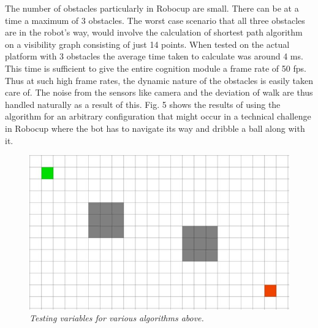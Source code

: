 \documentclass[letterpaper, 10 pt, conference]{ieeeconf}  %
\begin{document}
The number of obstacles particularly in Robocup are small. There can be at a time a maximum of 3 obstacles. The worst case scenario that all three obstacles are in the robot's way, would involve the calculation of shortest path algorithm on a visibility graph consisting of just 14 points. When tested on the actual platform with 3 obstacles the average time taken to calculate was around 4 ms. This time is sufficient to give the entire cognition module a frame rate of 50 fps. Thus at such high frame rates, the dynamic nature of the obstacles is easily taken care of. The noise from the sensors like camera and the deviation of walk are thus handled naturally as a result of this. Fig. 5 shows the results of using the algorithm for an arbitrary configuration that might occur in a technical challenge in Robocup where the bot has to navigate its way and dribble a ball along with it. 

\begin{figure}[t]  
\begin{center}  
\includegraphics[scale=0.4]{testbed.jpg}  
\caption{\small \sl Testing variables for various algorithms above.\label{fig:test3}}  
\end{center}  
\end{figure}
\end{document}
